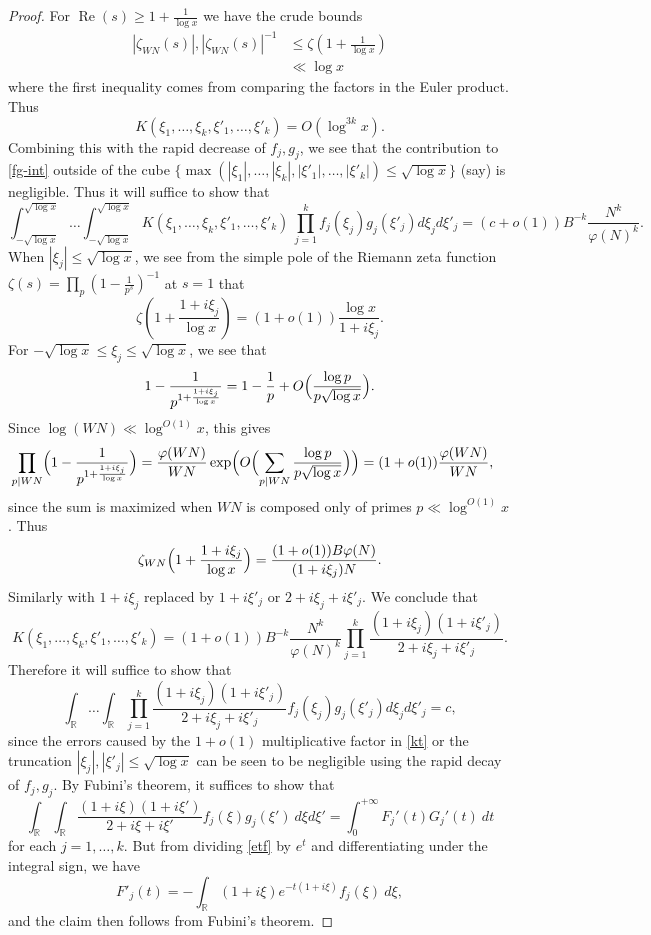 \documentclass{bmcart}
\theoremstyle{plain}
\theoremstyle{definition}
\newcommand\R{\mathbb{R}}
\renewcommand\Re{\operatorname{Re}}
\renewcommand{\phi}{\varphi}
\begin{document}
\begin{proof}
For $\Re(s) \geq 1 + \frac{1}{\log x}$ we have the crude bounds
\begin{align*}
 |\zeta_{W N}(s)|, |\zeta_{W N}(s)|^{-1} &\leq \zeta( 1 + \frac{1}{\log x}) \\
&\ll \log x
\end{align*}
where the first inequality comes from comparing the factors in the Euler product.
Thus
$$
 K(\xi_1,\dots,\xi_k,\xi'_1,\dots,\xi'_k) = O( \log^{3k} x ).$$
Combining this with the rapid decrease of $f_j, g_j$, we see that the contribution to \eqref{fg-int} outside of the cube $\{\max(|\xi_1|,\dots,|\xi_k|,|\xi'_1|,\dots,|\xi'_k|) \leq \sqrt{\log x}\}$ (say) is negligible.  Thus it will suffice to show that
$$
 \int_{-\sqrt{\log x}}^{\sqrt{\log x}} \dots \int_{-\sqrt{\log x}}^{\sqrt{\log x}} K(\xi_1,\dots,\xi_k,\xi'_1,\dots,\xi'_k)\ \prod_{j=1}^k f_j(\xi_j) g_j(\xi'_j) d\xi_j d\xi'_j = (c+o(1)) B^{-k}\frac{N^k}{\phi(N)^k}.
$$
When $|\xi_j| \leq \sqrt{\log x}$, we see from the simple pole of the Riemann zeta function $\zeta(s) = \prod_p (1-\frac{1}{p^s})^{-1}$ at $s=1$ that
$$ \zeta\left(1 + \frac{1+i\xi_j}{\log x}\right) = (1+o(1)) \frac{\log x}{1+i\xi_j}.$$
For $-\sqrt{\log{x}}\le \xi_j\le \sqrt{\log{x}}$, we see that
$$ 1-\frac{1}{p^{1+\frac{1+i\xi_j}{\log{x}}}}=1-\frac{1}{p}+O\Bigl(\frac{\log{p}}{p\sqrt{\log{x}}}\Bigr).$$
Since $\log(WN)\ll \log^{O(1)}{x}$, this gives
\begin{align*}
 \prod_{p|WN} \Bigl(1 - \frac{1}{p^{1+\frac{1+i\xi_j}{\log x}}}\Bigr) &= \frac{\phi(WN)}{WN}\exp\Bigl(O\Bigl(\sum_{p|WN}\frac{\log{p}}{p\sqrt{\log{x}}}\Bigr)\Bigr) = (1+o(1))\frac{\phi(WN)}{WN},
\end{align*}
since the sum is maximized when $WN$ is composed only of primes $p\ll \log^{O(1)}{x}$. Thus
$$ \zeta_{WN}\Bigl(1 + \frac{1+i\xi_j}{\log x}\Bigr) = \frac{(1+o(1)) B \phi(N)}{(1 + i\xi_j)N}.$$
Similarly with $1+i\xi_j$ replaced by $1+i\xi'_j$ or $2+i\xi_j+i\xi'_j$.  We conclude that
\begin{equation}\label{kt}
 K(\xi_1,\dots,\xi_k,\xi'_1,\dots,\xi'_k) = (1+o(1)) B^{-k}\frac{N^k}{\phi(N)^k} \prod_{j=1}^k \frac{(1+i\xi_j) (1+i\xi'_j)}{2+i\xi_j+i\xi'_j}.
\end{equation}
Therefore it will suffice to show that
$$
 \int_\R \dots \int_\R \prod_{j=1}^k \frac{(1+i\xi_j) (1+i\xi'_j)}{2+i\xi_j+i\xi'_j}  f_j(\xi_j) g_j(\xi'_j) d\xi_j d\xi'_j
= c,$$
since the errors caused by the $1+o(1)$ multiplicative factor in \eqref{kt} or the truncation $|\xi_j|, |\xi'_j| \leq \sqrt{\log x}$ can be seen to be negligible using the rapid decay of $f_j,g_j$.  By Fubini's theorem, it suffices to show that
$$ 
\int_\R \int_\R \frac{(1+i\xi) (1+i\xi')}{2+i\xi+i\xi'} f_j(\xi) g_j(\xi')\ d\xi d\xi' = \int_0^{+\infty} F_j'(t) G_j'(t)\ dt$$
for each $j=1,\dots,k$.
But from dividing \eqref{etf} by $e^t$ and differentiating under the integral sign, we have
$$F'_j(t) = - \int_\R (1+i\xi) e^{-t(1+i\xi)} f_j(\xi)\ d\xi,$$
and the claim then follows from Fubini's theorem.


\end{proof}
\end{document}
